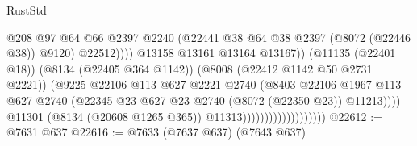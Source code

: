 \begin{lexlean}{RustStd}
\begin{coremodule}
{\begin{coremodule}
{{{{{{{{{{{{{{{{{{{{{{{{{{{{{{{{{{{{{{{{{{{{{{{{{{{{{                                                        @208
                                                        @97
                                                        @64
                                                        @66
                                                        @2397
                                                        @2240
                                                        (@22441
                                                          @38
                                                          @64
                                                          @38
                                                          @2397
                                                          (@8072 (@22446 @38))
                                                          @9120)
                                                        @22512))))
                                                @13158
                                                @13161
                                                @13164
                                                @13167))
                                            (@11135 (@22401 @18))
                                            (@8134 (@22405 @364 @1142))
                                            (@8008 (@22412 @1142 @50 @2731 @2221))
                                            (@9225
                                              @22106
                                              @113
                                              @627
                                              @2221
                                              @2740
                                              (@8403
                                                @22106
                                                @1967
                                                @113
                                                @627
                                                @2740
                                                (@22345
                                                  @23
                                                  @627
                                                  @23
                                                  @2740
                                                  (@8072 (@22350 @23))
                                                  @11213))))
                                          @11301
                                          (@8134 (@20608 @1265 @365))
                                          @11313)))))))))))))))))))
@22612 := @7631 @637
@22616 := @7633 (@7637 @637) (@7643 @637)
}}}}}}}}}}}}}}}}}}}}}}}}}}}}}}}}}}}}}}}}}}}}}}}}}}}}}
\end{coremodule}}
\end{coremodule}
\end{lexlean}
